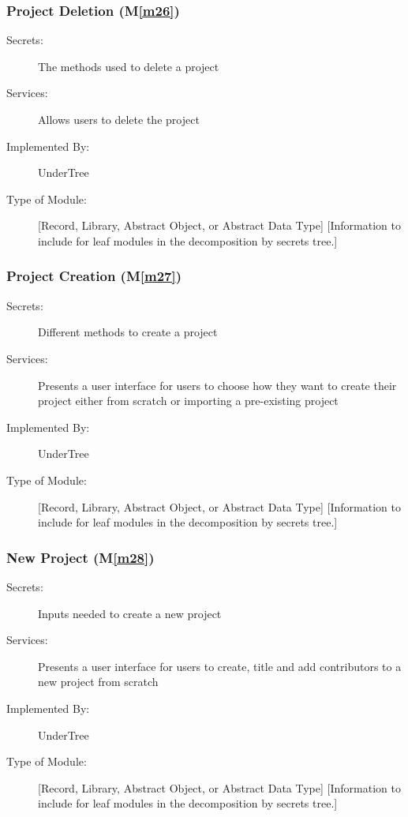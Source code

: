 \documentclass[12pt, titlepage]{article}
\newcommand{\mref}[1]{M\ref{#1}}
\begin{document}
	\subsubsection{Project Deletion (\mref{m26})}
	
	\begin{description}
		\item[Secrets:] The methods used to delete a project
		\item[Services:] Allows users to delete the project
		\item[Implemented By:] UnderTree
		\item[Type of Module:] [Record, Library, Abstract Object, or Abstract Data Type]
		[Information to include for leaf modules in the decomposition by secrets tree.]
	\end{description}
	
	\subsubsection{Project Creation (\mref{m27})}
	
	\begin{description}
		\item[Secrets:] Different methods to create a project
		\item[Services:] Presents a user interface for users to choose how they want to create their project either from scratch or importing a pre-existing project
		\item[Implemented By:] UnderTree
		\item[Type of Module:] [Record, Library, Abstract Object, or Abstract Data Type]
		[Information to include for leaf modules in the decomposition by secrets tree.]
	\end{description}
	
	\subsubsection{New Project (\mref{m28})}
	
	\begin{description}
		\item[Secrets:] Inputs needed to create a new project
		\item[Services:] Presents a user interface for users to create, title and add contributors to a new project from scratch
		\item[Implemented By:] UnderTree
		\item[Type of Module:] [Record, Library, Abstract Object, or Abstract Data Type]
		[Information to include for leaf modules in the decomposition by secrets tree.]
	\end{description}
	
\end{document}
